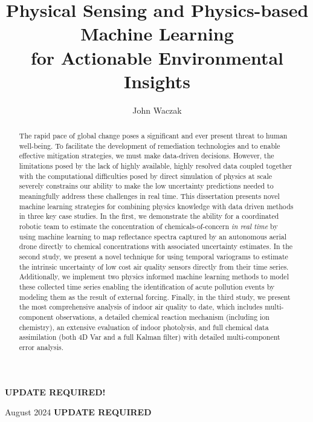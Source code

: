 \documentclass[doublespacing]{utdthesis}
\author{John Waczak}
\title{Physical Sensing and Physics-based Machine Learning \\ for Actionable Environmental Insights}
\begin{document}
\frontmatter

\signaturepage


\begin{dedication} %
  \color{red}
  \textbf{UPDATE REQUIRED!}
\end{dedication}


\maketitle

\begin{acks}{August 2024} %
  \color{red}
  \textbf{UPDATE REQUIRED} %
\end{acks}

\begin{abstract}

  The rapid pace of global change poses a significant and ever present threat to human well-being. To facilitate the development of remediation technologies and to enable effective mitigation strategies, we must make data-driven decisions. However, the limitations posed by the lack of highly available, highly resolved data coupled together with the computational diﬀiculties posed by direct simulation of physics at scale severely constrains our ability to make the low uncertainty predictions needed to meaningfully address these challenges in real time. This dissertation presents novel machine learning strategies for combining physics knowledge with data driven methods in three key case studies. In the first, we demonstrate the ability for a coordinated robotic team to estimate the concentration of chemicals-of-concern \textit{in real time} by using machine learning to map reflectance spectra captured by an autonomous aerial drone directly to chemical concentrations with associated uncertainty estimates. In the second study, we present a novel technique for using temporal variograms to estimate the intrinsic uncertainty of low cost air quality sensors directly from their time series. Additionally, we implement two physics informed machine learning methods to model these collected time series enabling the identification of acute pollution events by modeling them as the result of external forcing. Finally, in the third study, we present the most comprehensive analysis of indoor air quality to date, which includes multi-component observations, a detailed chemical reaction mechanism (including ion chemistry), an extensive evaluation of indoor photolysis, and full chemical data assimilation (both 4D Var and a full Kalman filter) with detailed multi-component error analysis.


\end{abstract}
\end{document}
